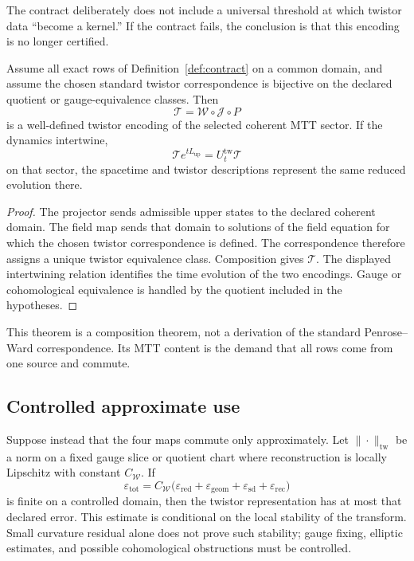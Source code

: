 \documentclass[11pt]{article}
\begin{document}
The contract deliberately does not include a universal threshold at which
twistor data ``become a kernel.'' If the contract fails, the conclusion is
that this encoding is no longer certified.

\begin{theorem}
\label{thm:descent}
Assume all exact rows of Definition~\ref{def:contract} on a common domain,
and assume the chosen standard twistor correspondence is bijective on the
declared quotient or gauge-equivalence classes. Then
\[
\mathcal T=\mathcal W\circ\mathcal J\circ P
\]
is a well-defined twistor encoding of the selected coherent MTT sector.
If the dynamics intertwine,
\[
\mathcal T e^{tL_{\mathrm{up}}}
=U_t^{\mathrm{tw}}\mathcal T
\]
on that sector, the spacetime and twistor descriptions represent the same
reduced evolution there.
\end{theorem}

\begin{proof}
The projector sends admissible upper states to the declared coherent domain.
The field map sends that domain to solutions of the field equation for which
the chosen twistor correspondence is defined. The correspondence therefore
assigns a unique twistor equivalence class. Composition gives
\(\mathcal T\). The displayed intertwining relation identifies the time
evolution of the two encodings. Gauge or cohomological equivalence is handled
by the quotient included in the hypotheses.
\end{proof}

This theorem is a composition theorem, not a derivation of the standard
Penrose--Ward correspondence. Its MTT content is the demand that all rows
come from one source and commute.

\subsection{Controlled approximate use}

Suppose instead that the four maps commute only approximately. Let
\(\|\cdot\|_{\mathrm{tw}}\) be a norm on a fixed gauge slice or quotient chart
where reconstruction is locally Lipschitz with constant \(C_{\mathcal W}\).
If
\[
\varepsilon_{\mathrm{tot}}
=
C_{\mathcal W}
\big(
\varepsilon_{\mathrm{red}}
+\varepsilon_{\mathrm{geom}}
+\varepsilon_{\mathrm{sd}}
+\varepsilon_{\mathrm{rec}}
\big)
\]
is finite on a controlled domain, then the twistor representation has at
most that declared error. This estimate is conditional on the local
stability of the transform. Small curvature residual alone does not prove
such stability; gauge fixing, elliptic estimates, and possible cohomological
obstructions must be controlled.
\end{document}
